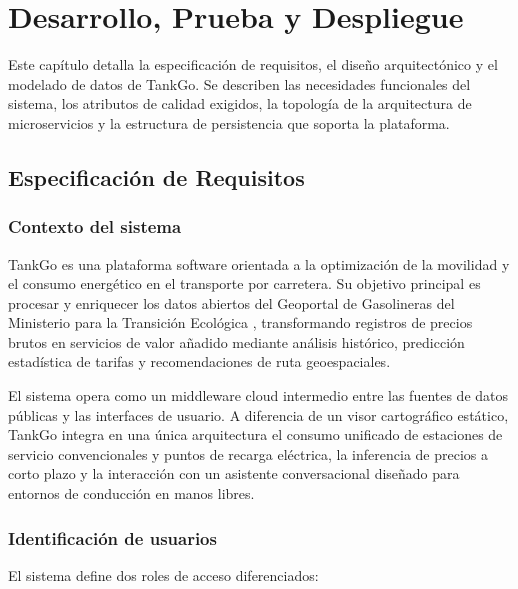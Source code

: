 \chapter{Desarrollo, Prueba y Despliegue}
\label{cap:desarrollo_sistema}

Este capítulo detalla la especificación de requisitos, el diseño arquitectónico y el modelado de datos de TankGo.
Se describen las necesidades funcionales del sistema, los atributos de calidad exigidos, la topología de la arquitectura
de microservicios y la estructura de persistencia que soporta la plataforma.

\section{Especificación de Requisitos}
\label{sec:especificacion}

\subsection{Contexto del sistema}
\label{subsec:contexto}

TankGo es una plataforma software orientada a la optimización de la movilidad y el consumo energético en el transporte por carretera.
Su objetivo principal es procesar y enriquecer los datos abiertos del Geoportal de Gasolineras del Ministerio para la Transición Ecológica \cite{geoportal_gasolineras},
transformando registros de precios brutos en servicios de valor añadido mediante análisis histórico, predicción estadística de tarifas y recomendaciones de ruta geoespaciales.

El sistema opera como un middleware cloud intermedio entre las fuentes de datos públicas y las interfaces de usuario.
A diferencia de un visor cartográfico estático, TankGo integra en una única arquitectura el consumo unificado de estaciones
de servicio convencionales y puntos de recarga eléctrica, la inferencia de precios a corto plazo y la interacción
con un asistente conversacional diseñado para entornos de conducción en manos libres.

\subsection{Identificación de usuarios}
\label{subsec:identificacion_usuarios}
El sistema define dos roles de acceso diferenciados:

